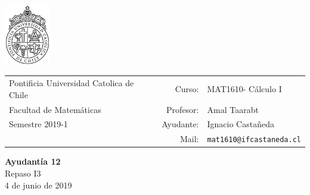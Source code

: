 \documentclass[12pt]{article}
\makeatletter
\newcommand{\ayudantia}{{\sc Ayudantía 12}}
\newcommand{\tituloayu}{Repaso I3}
\newcommand{\fecha}{4 de junio de 2019}
\newcommand{\sigla}{MAT1610}
\newcommand{\nombre}{Cálculo I}
\newcommand{\profesor}{Amal Taarabt}
\newcommand{\ano}{2019}
\newcommand{\semestre}{1}
\newcommand{\mail}{mat1610@ifcastaneda.cl}
\makeatother
\begin{document}
\thispagestyle{empty}

\begin{minipage}{2cm}
	\includegraphics[width=2cm]{../../../../img/logo.pdf}
	\vspace{0.5cm}
\end{minipage}
\begin{minipage}{\linewidth}
	\begin{tabular}{lrl}
		{\scriptsize\sc Pontificia Universidad Catolica de Chile} & \hspace*{0.7in}Curso: &
		\sigla  - \nombre\\
		{\sc Facultad de Matemáticas}&
		Profesor: & \profesor \\
		{\sc Semestre \ano-\semestre} & Ayudante: & {Ignacio Castañeda}\\
		& {Mail:} & \texttt{\mail}
	\end{tabular}
\end{minipage}

\vspace{-10mm}
\begin{center}
	{\LARGE\bf \ayudantia}\\
	\vspace{0.1cm}
	{\tituloayu}\\
	\vspace{0.1cm}
	\fecha\\
	\vspace{0.4cm}
\end{center}
\end{document}

